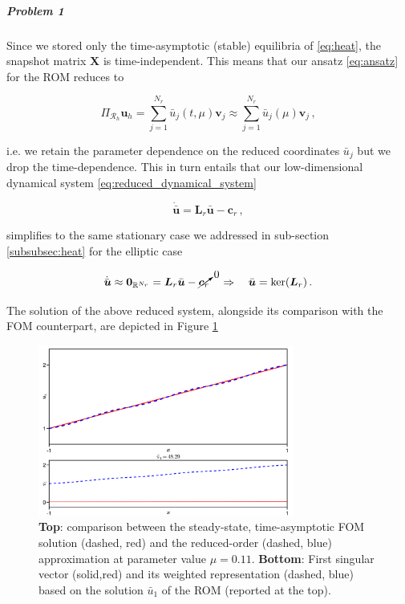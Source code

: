 \documentclass[../main.tex]{subfiles}
\begin{document}
\subparagraph{Problem 1}\label{subpar:problem1_rom}

Since we stored only the time-asymptotic (stable) equilibria of \eqref{eq:heat}, the snapshot matrix $\boldsymbol{X}$ is time-independent.
This means that our ansatz \eqref{eq:ansatz} for the ROM reduces to

\begin{equation*}
        \Pi_{\mathcal{R}_{h}}\boldsymbol{u}_{h}=\sum_{j=1}^{N_{r}}\bar{u}_{j}(t,\mu)\boldsymbol{v}_{j}\approx\sum_{j=1}^{N_{r}}\bar{u}_{j}(\mu)\boldsymbol{v}_{j}\,, 
\end{equation*}

i.e. we retain the parameter dependence on the reduced coordinates $\bar{u}_{j}$ but we drop the time-dependence.
This in turn entails that our low-dimensional dynamical system \eqref{eq:reduced_dynamical_system}

\begin{equation*}
        \dot{\bar{\boldsymbol{u}}} = \boldsymbol{L}_{r}\bar{\boldsymbol{u}} - \boldsymbol{c}_{r}\,,
\end{equation*}

simplifies to the same stationary case we addressed in sub-section \ref{subsubsec:heat} for the elliptic case 

\begin{equation*}
        \dot{\bar{\boldsymbol{u}}}\approx \boldsymbol{0}_{\mathbb{R}^{N_{r}}} = \boldsymbol{L}_{r}\bar{\boldsymbol{u}} - \cancelto{0}{\boldsymbol{c}_{r}}\quad\Rightarrow\quad \bar{\boldsymbol{u}} = \ker(\boldsymbol{L}_{r})\,.
\end{equation*}

The solution of the above reduced system, alongside its comparison with the FOM counterpart, are depicted in Figure \ref{fig:problem1_rom}

\begin{figure}[H]
    \centering 
    \includegraphics[keepaspectratio, width=0.75\textwidth]{../figures/fig:problem1_rom.png}
    \caption{\textbf{Top}: comparison between the steady-state, time-asymptotic FOM solution (dashed, red) and the reduced-order (dashed, blue) approximation at parameter value $\mu=0.11$.
    \textbf{Bottom}: First singular vector (solid,red) and its weighted representation (dashed, blue) based on the solution $\bar{u}_{1}$ of the ROM (reported at the top).}
    \label{fig:problem1_rom}
\end{figure}
\end{document}
